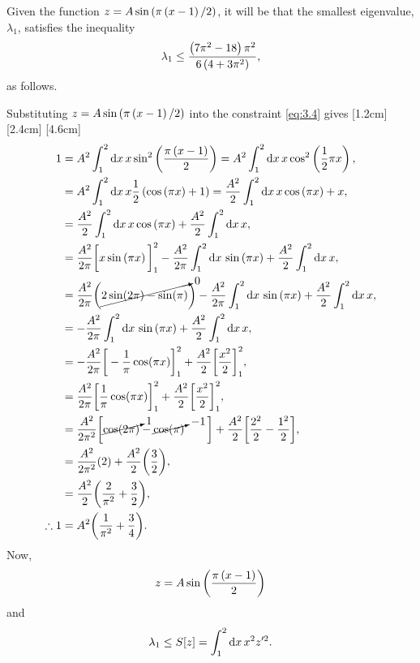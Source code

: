 Given the function $z=A\sin\left(\pi\left(x-1\right)/2\right)$, it will be that the smallest eigenvalue, $\lambda_1$, satisfies the inequality
\[
	\lambda_1\leq \frac{\left(7\pi^2-18\right)\pi^2}{6\left(4+3\pi^2\right)},
\]
as follows.

Substituting $z=A\sin\left(\pi\left(x-1\right)/2\right)$ into the constraint \eqref{eq:3.4} gives
[1.2cm]
[2.4cm]
[4.6cm]
\begin{align}
	1 &= A^2\int_{1}^{2}\mathrm{d} x\, x \sin^2\left(\frac{\pi\left(x-1\right)}{2}\right)
	= A^2\int_{1}^{2}\mathrm{d} x\, x\cos^2\left(\frac{1}{2}\pi x\right),\nonumber\\
	&= A^2\int_{1}^{2}\mathrm{d} x\, x \frac{1}{2}\left(\cos\left(\pi x\right) + 1\right) = \frac{A^2}{2}\int_{1}^{2}\mathrm{d} x\, x\cos\left(\pi x\right) + x,\nonumber\\
	&= \frac{A^2}{2}\int_{1}^{2}\mathrm{d} x\, x\cos\left(\pi x\right) + \frac{A^2}{2}\int_{1}^{2}\mathrm{d} x\, x,\nonumber\\
	&= \frac{A^2}{2\pi}\bigg[x\sin\left(\pi x\right)\bigg]_1^2 - \frac{A^2}{2\pi}\int_{1}^{2}\mathrm{d} x\,\sin\left(\pi x\right) + \frac{A^2}{2}\int_{1}^{2}\mathrm{d} x\, x,\nonumber\\
	&=\frac{A^2}{2\pi}\bigg(\cancelto{0}{2\sin(2\pi) - \sin(\pi)}\bigg)- \frac{A^2}{2\pi}\int_{1}^{2}\mathrm{d} x\,\sin\left(\pi x\right) + \frac{A^2}{2}\int_{1}^{2}\mathrm{d} x\, x,\nonumber\\
	&=-\frac{A^2}{2\pi}\int_{1}^{2}\mathrm{d} x\,\sin\left(\pi x\right) + \frac{A^2}{2}\int_{1}^{2}\mathrm{d} x\, x,\nonumber\\
	&=-\frac{A^2}{2\pi}\bigg[-\frac{1}{\pi}\cos(\pi x)\bigg]_1^2 + \frac{A^2}{2}\bigg[\frac{x^2}{2}\bigg]_1^2,\nonumber\\
	&= \frac{A^2}{2\pi}\bigg[\frac{1}{\pi}\cos(\pi x)\bigg]_1^2 + \frac{A^2}{2}\bigg[\frac{x^2}{2}\bigg]_1^2,\nonumber\\
	&= \frac{A^2}{2\pi^2}\bigg[\cancelto{1}{\cos(2\pi)}-\cancelto{-1}{\cos(\pi)}\quad\quad\bigg] + \frac{A^2}{2}\bigg[\frac{2^2}{2}-\frac{1^2}{2}\bigg],\nonumber\\
	&= \frac{A^2}{2\pi^2}(2)+ \frac{A^2}{2}\bigg(\frac{3}{2}\bigg),\nonumber\\
	&= \frac{A^2}{2}\bigg(\frac{2}{\pi^2}+\frac{3}{2}\bigg),\nonumber\\
		\label{eq:3.6}
	\therefore 1&= A^2\bigg(\frac{1}{\pi^2}+\frac{3}{4}\bigg).
\end{align}
Now,
\[
	z=A\sin\left(\frac{\pi\left(x-1\right)}{2}\right)
\]
and
\begin{align}
\label{eq:3.7}
\lambda_1 \leq S[z] = \int_{1}^{2}\mathrm{d} x\, x^2 z^{\prime 2}.
\end{align}
